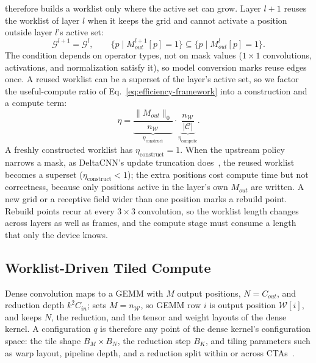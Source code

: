 \sysname therefore builds a worklist only where the active set can grow. Layer
$l+1$ reuses the worklist of layer $l$ when it keeps the grid and cannot
activate a position outside layer $l$'s active set:
\begin{equation}
  \mathcal{G}^{l+1}=\mathcal{G}^{l},\qquad
  \{p \mid M^{l+1}_{out}[p]=1\} \subseteq \{p \mid M^{l}_{out}[p]=1\}.
  \label{eq:reuse-condition}
\end{equation}
The condition depends on operator types, not on mask values ($1\times1$
convolutions, activations, and normalization satisfy it), so model conversion
marks reuse edges once. A reused worklist can be a superset of the layer's
active set, so we factor the useful-compute ratio of
Eq.~\ref{eq:efficiency-framework} into a construction and a compute term:
\begin{equation}
  \eta
  = \underbrace{\frac{\|M_{out}\|_0}{n_{\mathcal{W}}}}_{\eta_{\mathrm{construct}}}
  \cdot
  \underbrace{\frac{n_{\mathcal{W}}}{|\mathcal{C}|}}_{\eta_{\mathrm{compute}}} .
  \label{eq:eta-decomp}
\end{equation}
A freshly constructed worklist has $\eta_{\mathrm{construct}}=1$. When the
upstream policy narrows a mask, as DeltaCNN's update truncation
does~\cite{deltacnn}, the reused worklist becomes a superset
($\eta_{\mathrm{construct}}<1$); the extra positions cost compute time but
not correctness, because only positions active in the layer's own $M_{out}$
are written. A new grid or a receptive field wider than one position
marks a rebuild point. Rebuild points recur at every $3\times3$ convolution, so the worklist length changes across layers as well as frames,
and the compute stage must consume a length that only the device knows.

\subsection{Worklist-Driven Tiled Compute}
\label{sec:design:compute}

Dense convolution maps to a GEMM with $M$ output positions, $N=C_{out}$, and
reduction depth $k^2C_{in}$; \sysname sets $M=n_{\mathcal{W}}$, so GEMM row $i$
is output position $\mathcal{W}[i]$, and keeps $N$, the reduction, and the
tensor and weight layouts of the dense kernel. A configuration $q$ is therefore
any point of the dense kernel's configuration space: the tile shape
$B_M\times B_N$, the reduction step $B_K$, and tiling parameters such as warp
layout, pipeline depth, and a reduction split within or across
CTAs~\cite{cutlass}.

